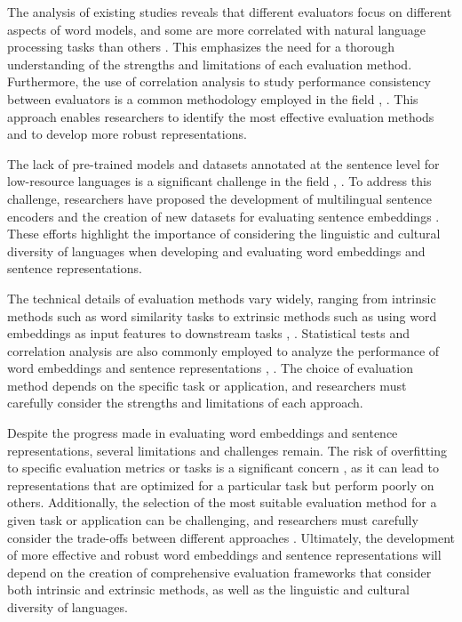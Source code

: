 \documentclass[conference]{IEEEtran}
\begin{document}
The analysis of existing studies reveals that different evaluators focus on different aspects of word models, and some are more correlated with natural language processing tasks than others \cite{b2}. This emphasizes the need for a thorough understanding of the strengths and limitations of each evaluation method. Furthermore, the use of correlation analysis to study performance consistency between evaluators is a common methodology employed in the field \cite{b1}, \cite{b3}. This approach enables researchers to identify the most effective evaluation methods and to develop more robust representations.

The lack of pre-trained models and datasets annotated at the sentence level for low-resource languages is a significant challenge in the field \cite{b4}, \cite{b5}. To address this challenge, researchers have proposed the development of multilingual sentence encoders \cite{b6} and the creation of new datasets for evaluating sentence embeddings \cite{b7}. These efforts highlight the importance of considering the linguistic and cultural diversity of languages when developing and evaluating word embeddings and sentence representations.

The technical details of evaluation methods vary widely, ranging from intrinsic methods such as word similarity tasks to extrinsic methods such as using word embeddings as input features to downstream tasks \cite{b1}, \cite{b2}. Statistical tests and correlation analysis are also commonly employed to analyze the performance of word embeddings and sentence representations \cite{b3}, \cite{b8}. The choice of evaluation method depends on the specific task or application, and researchers must carefully consider the strengths and limitations of each approach.

Despite the progress made in evaluating word embeddings and sentence representations, several limitations and challenges remain. The risk of overfitting to specific evaluation metrics or tasks is a significant concern \cite{b9}, as it can lead to representations that are optimized for a particular task but perform poorly on others. Additionally, the selection of the most suitable evaluation method for a given task or application can be challenging, and researchers must carefully consider the trade-offs between different approaches \cite{b10}. Ultimately, the development of more effective and robust word embeddings and sentence representations will depend on the creation of comprehensive evaluation frameworks that consider both intrinsic and extrinsic methods, as well as the linguistic and cultural diversity of languages.
\end{document}
